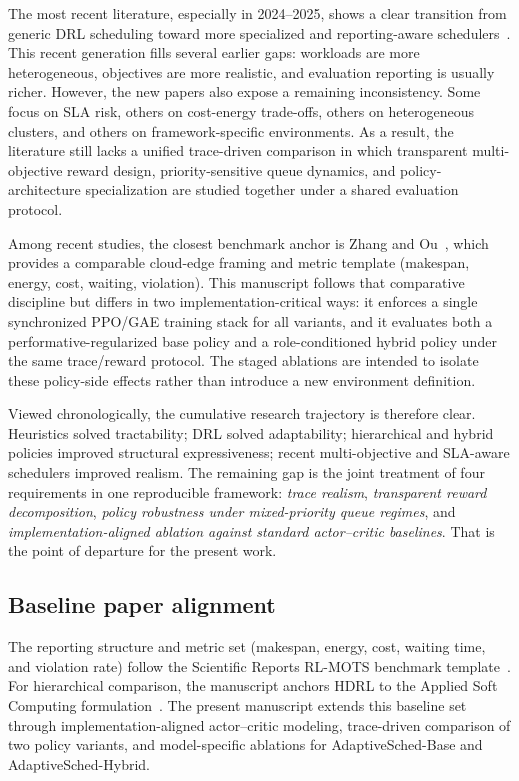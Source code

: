 \documentclass[journal]{IEEEtran}
\begin{document}
The most recent literature, especially in 2024--2025, shows a clear transition from generic DRL scheduling toward more specialized and reporting-aware schedulers~\cite{zhou2024aireview, zhang2025s41598}. This recent generation fills several earlier gaps: workloads are more heterogeneous, objectives are more realistic, and evaluation reporting is usually richer. However, the new papers also expose a remaining inconsistency. Some focus on SLA risk, others on cost-energy trade-offs, others on heterogeneous clusters, and others on framework-specific environments. As a result, the literature still lacks a unified trace-driven comparison in which transparent multi-objective reward design, priority-sensitive queue dynamics, and policy-architecture specialization are studied together under a shared evaluation protocol.

Among recent studies, the closest benchmark anchor is Zhang and Ou~\cite{zhang2025s41598}, which provides a comparable cloud-edge framing and metric template (makespan, energy, cost, waiting, violation). This manuscript follows that comparative discipline but differs in two implementation-critical ways: it enforces a single synchronized PPO/GAE training stack for all variants, and it evaluates both a performative-regularized base policy and a role-conditioned hybrid policy under the same trace/reward protocol. The staged ablations are intended to isolate these policy-side effects rather than introduce a new environment definition.

Viewed chronologically, the cumulative research trajectory is therefore clear. Heuristics solved tractability; DRL solved adaptability; hierarchical and hybrid policies improved structural expressiveness; recent multi-objective and SLA-aware schedulers improved realism. The remaining gap is the joint treatment of four requirements in one reproducible framework: \emph{trace realism}, \emph{transparent reward decomposition}, \emph{policy robustness under mixed-priority queue regimes}, and \emph{implementation-aligned ablation against standard actor--critic baselines}. That is the point of departure for the present work.

\subsection*{Baseline paper alignment}
The reporting structure and metric set (makespan, energy, cost, waiting time, and violation rate) follow the Scientific Reports RL-MOTS benchmark template~\cite{zhang2025s41598}. For hierarchical comparison, the manuscript anchors HDRL to the Applied Soft Computing formulation~\cite{zhang2024hdrl}. The present manuscript extends this baseline set through implementation-aligned actor--critic modeling, trace-driven comparison of two policy variants, and model-specific ablations for AdaptiveSched-Base and AdaptiveSched-Hybrid.
\end{document}
